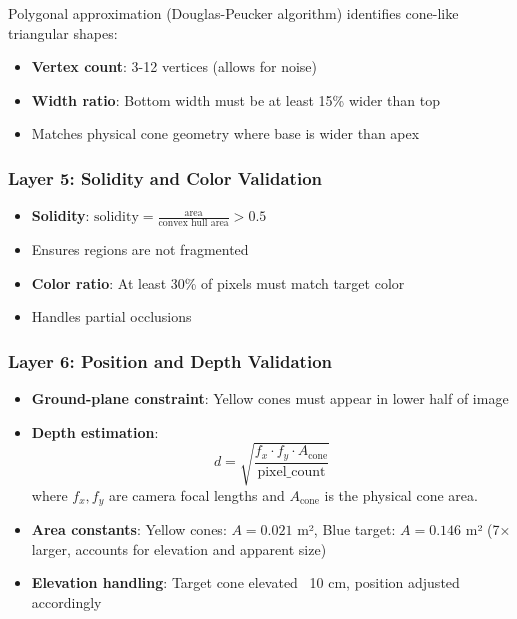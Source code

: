 \documentclass[11pt,a4paper]{article}
\begin{document}
Polygonal approximation (Douglas-Peucker algorithm) identifies cone-like triangular shapes:
\begin{itemize}
    \item \textbf{Vertex count}: 3-12 vertices (allows for noise)
    \item \textbf{Width ratio}: Bottom width must be at least 15\% wider than top
    \item Matches physical cone geometry where base is wider than apex
\end{itemize}

\subsubsection{Layer 5: Solidity and Color Validation}

\begin{itemize}
    \item \textbf{Solidity}: $\text{solidity} = \frac{\text{area}}{\text{convex hull area}} > 0.5$
    \item Ensures regions are not fragmented
    \item \textbf{Color ratio}: At least 30\% of pixels must match target color
    \item Handles partial occlusions
\end{itemize}

\subsubsection{Layer 6: Position and Depth Validation}

\begin{itemize}
    \item \textbf{Ground-plane constraint}: Yellow cones must appear in lower half of image
    \item \textbf{Depth estimation}: 
    \begin{equation}
    d = \sqrt{\frac{f_x \cdot f_y \cdot A_{\text{cone}}}{\text{pixel\_count}}}
    \end{equation}
    where $f_x, f_y$ are camera focal lengths and $A_{\text{cone}}$ is the physical cone area.
    \item \textbf{Area constants}: Yellow cones: $A = 0.021$ m², Blue target: $A = 0.146$ m² (7× larger, accounts for elevation and apparent size)
    \item \textbf{Elevation handling}: Target cone elevated ~10 cm, position adjusted accordingly
\end{itemize}
\end{document}

